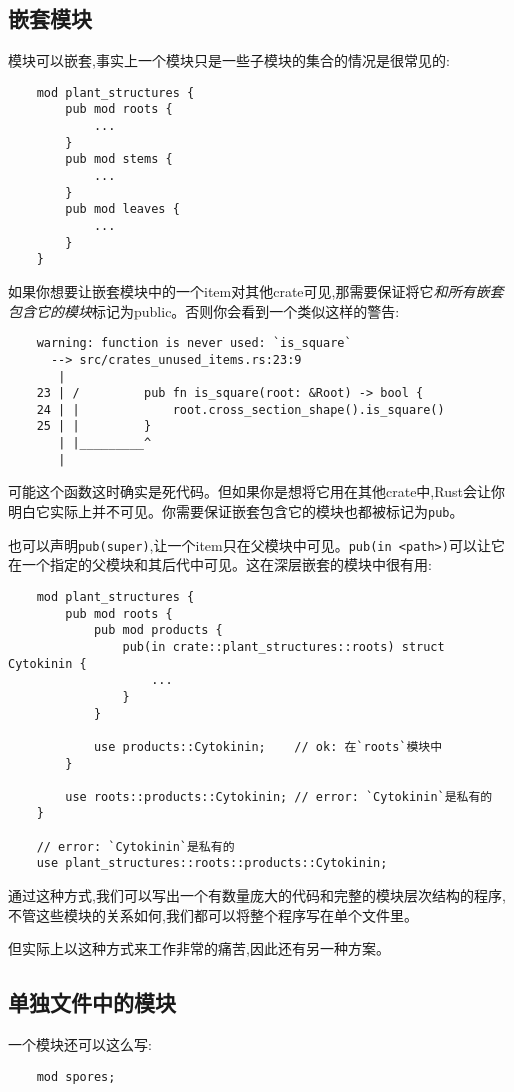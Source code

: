 \subsection{嵌套模块}

模块可以嵌套,事实上一个模块只是一些子模块的集合的情况是很常见的:
\begin{verbatim}
    mod plant_structures {
        pub mod roots {
            ...
        }
        pub mod stems {
            ...
        }
        pub mod leaves {
            ...
        }
    }
\end{verbatim}

如果你想要让嵌套模块中的一个item对其他crate可见,那需要保证将它\emph{和所有嵌套包含它的模块}标记为public。否则你会看到一个类似这样的警告:
\begin{verbatim}
    warning: function is never used: `is_square`
      --> src/crates_unused_items.rs:23:9
       |
    23 | /         pub fn is_square(root: &Root) -> bool {
    24 | |             root.cross_section_shape().is_square()
    25 | |         }
       | |_________^
       |
\end{verbatim}

可能这个函数这时确实是死代码。但如果你是想将它用在其他crate中,Rust会让你明白它实际上并不可见。你需要保证嵌套包含它的模块也都被标记为\texttt{pub}。

也可以声明\texttt{pub(super)},让一个item只在父模块中可见。\texttt{pub(in <path>)}可以让它在一个指定的父模块和其后代中可见。这在深层嵌套的模块中很有用:
\begin{verbatim}
    mod plant_structures {
        pub mod roots {
            pub mod products {
                pub(in crate::plant_structures::roots) struct Cytokinin {
                    ...
                }
            }

            use products::Cytokinin;    // ok: 在`roots`模块中
        }

        use roots::products::Cytokinin; // error: `Cytokinin`是私有的
    }

    // error: `Cytokinin`是私有的
    use plant_structures::roots::products::Cytokinin;
\end{verbatim}

通过这种方式,我们可以写出一个有数量庞大的代码和完整的模块层次结构的程序,不管这些模块的关系如何,我们都可以将整个程序写在单个文件里。

但实际上以这种方式来工作非常的痛苦,因此还有另一种方案。

\subsection{单独文件中的模块}
一个模块还可以这么写:
\begin{verbatim}
    mod spores;
\end{verbatim}


